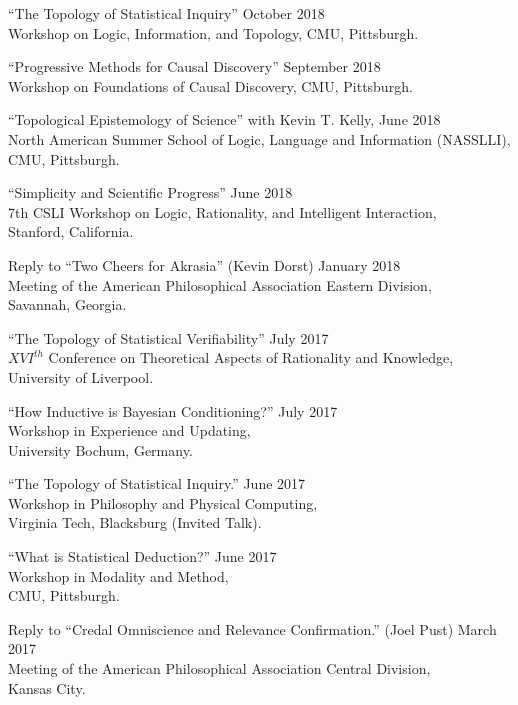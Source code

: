 \documentclass[12pt]{res} %
\begin{document}
\begin{resume}
``The Topology of Statistical Inquiry'' \hfill October 2018\\
Workshop on Logic, Information, and Topology,
CMU, Pittsburgh.

``Progressive Methods for Causal Discovery'' \hfill September 2018\\
Workshop on Foundations of Causal Discovery,
CMU, Pittsburgh.

``Topological Epistemology of Science'' with Kevin T. Kelly,  \hfill June  2018\\
North American Summer School of Logic, Language and Information (NASSLLI),\\
CMU, Pittsburgh.

``Simplicity and Scientific Progress'' \hfill June 2018\\
7th CSLI Workshop on Logic, Rationality, and Intelligent Interaction,\\
Stanford, California.

Reply to ``Two Cheers for Akrasia'' (Kevin Dorst) \hfill January 2018\\
Meeting of the American Philosophical Association Eastern Division,\\ 
Savannah, Georgia.

``The Topology of Statistical Verifiability'' \hfill July 2017\\
$XVI^{th}$ Conference on Theoretical Aspects of Rationality and Knowledge,\\
University of Liverpool. 

``How Inductive is Bayesian Conditioning?'' \hfill July 2017\\
Workshop in Experience and Updating,\\
University Bochum, Germany.

``The Topology of Statistical Inquiry.'' \hfill June 2017\\
Workshop in Philosophy and Physical Computing, \\
Virginia Tech, Blacksburg (Invited Talk).

``What is Statistical Deduction?'' \hfill June 2017\\
Workshop in Modality and Method, \\
CMU, Pittsburgh.

Reply to ``Credal Omniscience and Relevance Confirmation.'' (Joel Pust) \hfill March 2017\\
Meeting of the American Philosophical Association Central Division,\\ 
Kansas City.


\end{resume}
\end{document}
